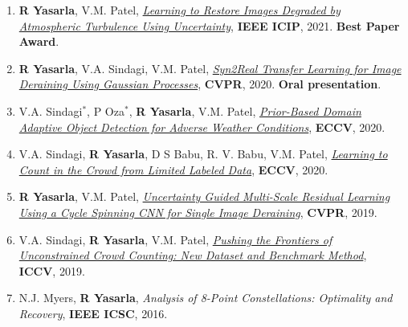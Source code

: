 \documentclass[margin,11pt]{resume}
\begin{document}
\begin{enumerate}[leftmargin=*,itemsep=0pt,topsep=2pt]
    \item \textbf{R Yasarla}, V.M. Patel, \textit{\href{https://ieeexplore.ieee.org/abstract/document/9506614}{Learning to Restore Images Degraded by Atmospheric Turbulence Using Uncertainty}}, \textbf{IEEE ICIP}, 2021. \textbf{Best Paper Award}.
    \item \textbf{R Yasarla}, V.A. Sindagi, V.M. Patel, \textit{\href{http://openaccess.thecvf.com/content_CVPR_2020/html/Yasarla_Syn2Real_Transfer_Learning_for_Image_Deraining_Using_Gaussian_Processes_CVPR_2020_paper.html}{Syn2Real Transfer Learning for Image Deraining Using Gaussian Processes}}, \textbf{CVPR}, 2020. \textbf{Oral presentation}.
    \item V.A. Sindagi$^{*}$, P Oza$^{*}$, \textbf{R Yasarla}, V.M. Patel, \textit{\href{https://arxiv.org/pdf/1912.00070.pdf}{Prior-Based Domain Adaptive Object Detection for Adverse Weather Conditions}}, \textbf{ECCV}, 2020.
    \item V.A. Sindagi, \textbf{R Yasarla}, D S Babu, R. V. Babu, V.M. Patel, \textit{\href{https://arxiv.org/pdf/2007.03195.pdf}{Learning to Count in the Crowd from Limited Labeled Data}}, \textbf{ECCV}, 2020.
    \item \textbf{R Yasarla}, V.M. Patel, \textit{\href{https://arxiv.org/pdf/1906.11129.pdf}{Uncertainty Guided Multi-Scale Residual Learning Using a Cycle Spinning CNN for Single Image Deraining}}, \textbf{CVPR}, 2019.
    \item V.A. Sindagi, \textbf{R Yasarla}, V.M. Patel, \textit{\href{https://openaccess.thecvf.com/content_ICCV_2019/html/Sindagi_Pushing_the_Frontiers_of_Unconstrained_Crowd_Counting_New_Dataset_and_ICCV_2019_paper.html}{Pushing the Frontiers of Unconstrained Crowd Counting: New Dataset and Benchmark Method}}, \textbf{ICCV}, 2019.
    \item N.J. Myers, \textbf{R Yasarla}, \textit{Analysis of 8-Point Constellations: Optimality and Recovery}, \textbf{IEEE ICSC}, 2016.
\end{enumerate}
\end{document}
